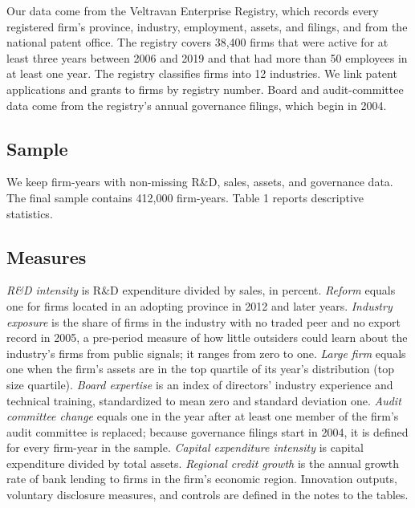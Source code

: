 \documentclass[12pt]{article}
\begin{document}
Our data come from the Veltravan Enterprise Registry, which records every registered firm's province, industry, employment, assets, and filings, and from the national patent office. The registry covers 38,400 firms that were active for at least three years between 2006 and 2019 and that had more than 50 employees in at least one year. The registry classifies firms into 12 industries. We link patent applications and grants to firms by registry number. Board and audit-committee data come from the registry's annual governance filings, which begin in 2004.

\subsection{Sample}

We keep firm-years with non-missing R\&D, sales, assets, and governance data. The final sample contains 412,000 firm-years. Table 1 reports descriptive statistics.

\subsection{Measures}

\textit{R\&D intensity} is R\&D expenditure divided by sales, in percent. \textit{Reform} equals one for firms located in an adopting province in 2012 and later years. \textit{Industry exposure} is the share of firms in the industry with no traded peer and no export record in 2005, a pre-period measure of how little outsiders could learn about the industry's firms from public signals; it ranges from zero to one. \textit{Large firm} equals one when the firm's assets are in the top quartile of its year's distribution (top size quartile). \textit{Board expertise} is an index of directors' industry experience and technical training, standardized to mean zero and standard deviation one. \textit{Audit committee change} equals one in the year after at least one member of the firm's audit committee is replaced; because governance filings start in 2004, it is defined for every firm-year in the sample. \textit{Capital expenditure intensity} is capital expenditure divided by total assets. \textit{Regional credit growth} is the annual growth rate of bank lending to firms in the firm's economic region. Innovation outputs, voluntary disclosure measures, and controls are defined in the notes to the tables.
\end{document}
